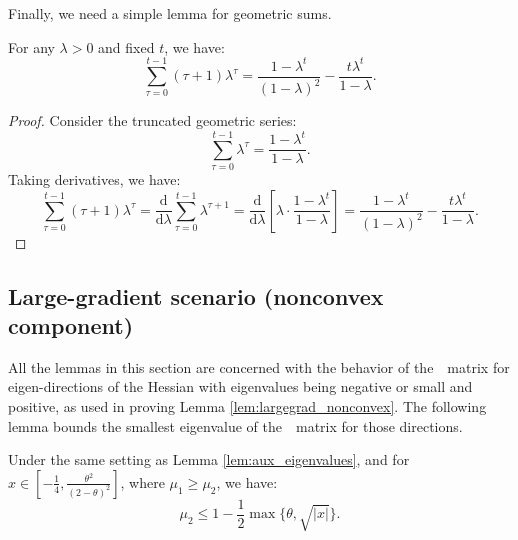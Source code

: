 Finally, we need a simple lemma for geometric sums.
\begin{lemma}\label{lem:aux_geometric_power}
For any $\lambda >0$ and fixed $t$, we have:
\begin{equation*}
 \sum_{\tau = 0}^{t-1} (\tau +1) \lambda^\tau =
 \frac{1-\lambda^t}{(1-\lambda)^2} - \frac{t\lambda^t}{1-\lambda}.
 \end{equation*} 
\end{lemma}
\begin{proof}
Consider the truncated geometric series:
\begin{equation*}
 \sum_{\tau = 0}^{t-1} \lambda^\tau =
 \frac{1-\lambda^t}{1-\lambda}.
\end{equation*}
Taking derivatives, we have:
\begin{equation*}
 \sum_{\tau = 0}^{t-1} (\tau +1) \lambda^\tau = \frac{\mathrm{d}}{\mathrm{d}\lambda}\sum_{\tau = 0}^{t-1} \lambda^{\tau+1} =
 \frac{\mathrm{d}}{\mathrm{d}\lambda}\left[\lambda \cdot\frac{1-\lambda^t}{1-\lambda}\right]
 =\frac{1-\lambda^t}{(1-\lambda)^2} - \frac{t\lambda^t}{1-\lambda}.
\end{equation*}
\end{proof}

\subsection{Large-gradient scenario (nonconvex component)}
All the lemmas in this section are concerned with the behavior 
of the~\nag~matrix for eigen-directions of the Hessian with 
eigenvalues being negative or small and positive, as used 
in proving Lemma \ref{lem:largegrad_nonconvex}.
The following lemma bounds the smallest eigenvalue of 
the~\nag~matrix for those directions.
\begin{lemma}\label{lem:aux_nonconvex_mu2}
Under the same setting as Lemma \ref{lem:aux_eigenvalues}, 
and for $x \in [-\frac{1}{4}, \frac{\theta^2}{(2-\theta)^2}]$, 
where $\mu_1 \ge \mu_2$, we have:
\begin{equation*}
\mu_2 \le 1 - \frac{1}{2}\max\{\theta, \sqrt{|x|}\}.
\end{equation*}
\end{lemma}

